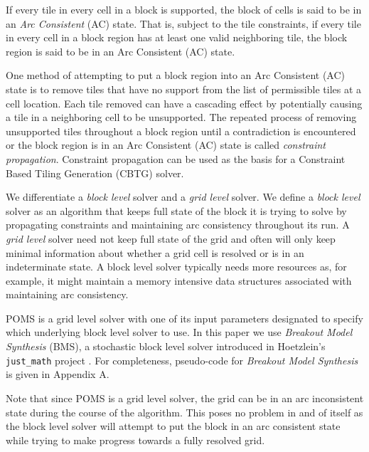 If every tile in every cell in a block is supported, the block of cells is said to be in an \textit{Arc Consistent} (AC) state.
That is, subject to the tile constraints, if every tile in every cell in a block region has at least one valid neighboring tile, the block region
is said to be in an Arc Consistent (AC) state.

One method of attempting to put a block region into an Arc Consistent (AC) state is to remove tiles that have no support from the list of permissible
tiles at a cell location.
Each tile removed can have a cascading effect by potentially causing a tile in a neighboring cell to be unsupported.
The repeated process of removing unsupported tiles throughout a block region until a contradiction is encountered or the block region
is in an Arc Consistent (AC) state is called \textit{constraint propagation}.
Constraint propagation
can be used as the basis for a Constraint Based Tiling Generation (CBTG) solver.

We differentiate a \textit{block level} solver and a \textit{grid level} solver.
We define a \textit{block level} solver as an algorithm that
keeps full state of the block it is trying to solve by propagating constraints and maintaining arc consistency
throughout its run.
A \textit{grid level} solver need not keep full state of the grid and often will only keep minimal information about whether
a grid cell is resolved or is in an indeterminate state.
A block level solver typically needs more resources as, for example,
it might maintain a memory intensive data structures associated
with maintaining arc consistency.

POMS is a grid level solver with one of its input parameters designated to specify
which underlying block level solver to use.
In this paper we use \textit{Breakout Model Synthesis} (BMS), a stochastic block level solver
introduced in Hoetzlein's \texttt{just\_math} project  \cite{Hoetzlein_2023}.
For completeness, pseudo-code for \textit{Breakout Model Synthesis} is given in Appendix A.

Note that since  POMS is a grid level solver, the grid can be in an arc inconsistent
state during the course of the algorithm.
This poses no problem in and of itself as the block level solver will attempt to put the block
in an arc consistent state while trying to make progress towards a fully resolved
grid.



